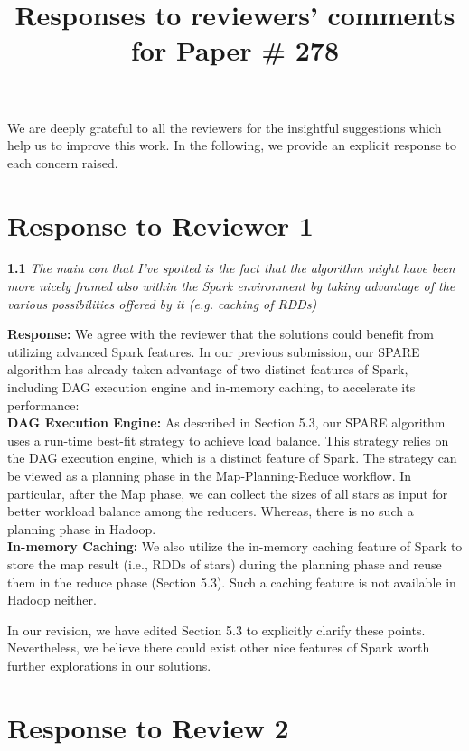 \documentclass{vldb}
\begin{document}
\title{Responses to reviewers' comments for Paper \# 278}
\maketitle

We are deeply grateful to all the reviewers for the 
insightful
suggestions which help us to improve this work.
In the following, we provide an explicit response to each concern raised.

\section{Response to Reviewer 1}

\textbf{1.1} \emph{The main con that I've spotted is the fact that the algorithm might have been
more nicely framed also within the Spark environment by taking advantage of
the various possibilities offered by it (e.g. caching of RDDs)}

\textbf{Response:} We agree with the reviewer that the solutions could benefit from utilizing advanced Spark features. 
In our previous submission, our SPARE algorithm has already
taken advantage of two distinct features of Spark, including  DAG execution engine and in-memory caching, to accelerate its performance:\\
\noindent\textbf{DAG Execution Engine:} As described in Section 5.3, our SPARE algorithm uses a run-time best-fit strategy to achieve load balance. This strategy relies on the DAG execution engine, which is a distinct feature of Spark. The strategy can be viewed as a planning phase in the Map-Planning-Reduce workflow. In particular, after the Map phase, we can collect the sizes of all stars as input for better workload balance among the reducers. Whereas, there is no such a planning phase in Hadoop. \\
\noindent\textbf{In-memory Caching:} We also utilize the in-memory caching feature of Spark to store the map result (i.e., RDDs of stars)
during the planning phase and reuse them in the reduce phase (Section 5.3). Such a caching feature is not available in Hadoop neither.

In our revision, we have edited Section 5.3 to explicitly clarify these points. Nevertheless, we believe there could exist other nice features of Spark worth further explorations in our solutions. 

\section{Response to Review 2}
\end{document}
